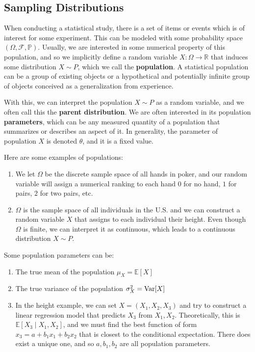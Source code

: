 \subsection{Sampling Distributions}

  \begin{definition}
    When conducting a statistical study, there is a set of items or events which is of interest for some experiment. This can be modeled with some probability space $(\Omega, \mathcal{F}, \mathbb{P})$. Usually, we are interested in some numerical property of this population, and so we implicitly define a random variable $X: \Omega \longrightarrow \mathbb{R}$ that induces some distribution $X \sim P$, which we call the \textbf{population}. A statistical population can be a group of existing objects or a hypothetical and potentially infinite group of objects conceived as a generalization from experience. 

    With this, we can interpret the population $X \sim P$ as a random variable, and we often call this the \textbf{parent distribution}. We are often interested in its population \textbf{parameters}, which can be any measured quantity of a population that summarizes or describes an aspect of it. In generality, the parameter of population $X$ is denoted $\theta$, and it is a fixed value. 
  \end{definition} 

  \begin{example}[Populations]
    Here are some examples of populations: 
    \begin{enumerate}
      \item We let $\Omega$ be the discrete sample space of all hands in poker, and our random variable will assign a numerical ranking to each hand $0$ for no hand, $1$ for pairs, $2$ for two pairs, etc. 
      \item $\Omega$ is the sample space of all individuals in the U.S. and we can construct a random variable $X$ that assigns to each individual their height. Even though $\Omega$ is finite, we can interpret it as continuous, which leads to a continuous distribution $X \sim P$. 
    \end{enumerate}
  \end{example}

  \begin{example}[Parameters]
    Some population parameters can be: 
    \begin{enumerate}
      \item The true mean of the population $\mu_X = \mathbb{E} [X]$
      \item The true variance of the population $\sigma^2_X = \operatorname{Var}[X]$ 
      \item In the height example, we can set $X = (X_1, X_2, X_3)$ and try to construct a linear regression model that predicts $X_3$ from $X_1, X_2$. Theoretically, this is $\mathbb{E}[X_3 \mid X_1, X_2]$, and we must find the best function of form $x_3 = a + b_1 x_1 + b_2 x_2$ that is closest to the conditional expectation. There does exist a unique one, and so $a, b_1, b_2$ are all population parameters. 
    \end{enumerate}
  \end{example}

